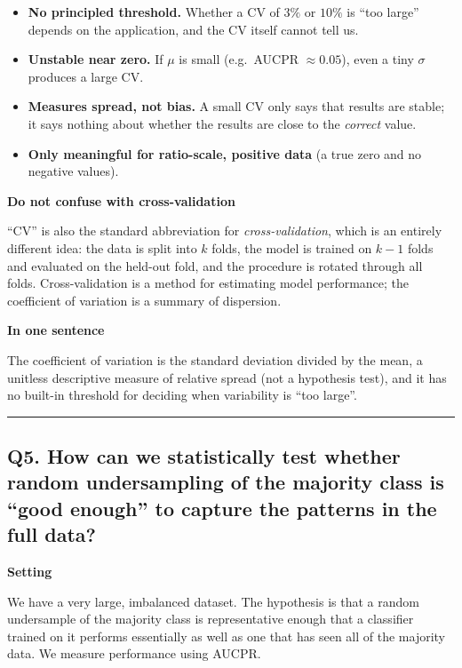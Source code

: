 \documentclass[11pt]{article}
\begin{document}
\begin{itemize}
    \item \textbf{No principled threshold.} Whether a CV of \(3\%\) or \(10\%\) is ``too large'' depends on the application, and the CV itself cannot tell us.
    \item \textbf{Unstable near zero.} If \(\mu\) is small (e.g.\ AUCPR \(\approx 0.05\)), even a tiny \(\sigma\) produces a large CV.
    \item \textbf{Measures spread, not bias.} A small CV only says that results are stable; it says nothing about whether the results are close to the \emph{correct} value.
    \item \textbf{Only meaningful for ratio-scale, positive data} (a true zero and no negative values).
\end{itemize}

\textbf{Do not confuse with cross-validation}

``CV'' is also the standard abbreviation for \emph{cross-validation}, which is an entirely different idea: the data is split into \(k\) folds, the model is trained on \(k-1\) folds and evaluated on the held-out fold, and the procedure is rotated through all folds. Cross-validation is a method for estimating model performance; the coefficient of variation is a summary of dispersion.

\textbf{In one sentence}

The coefficient of variation is the standard deviation divided by the mean, a unitless descriptive measure of relative spread (not a hypothesis test), and it has no built-in threshold for deciding when variability is ``too large''.

\vspace{5mm}
\hrule
\vspace{5mm}

\subsection*{Q5. How can we statistically test whether random undersampling of the majority class is ``good enough'' to capture the patterns in the full data?}

\textbf{Setting}

We have a very large, imbalanced dataset. The hypothesis is that a random undersample of the majority class is representative enough that a classifier trained on it performs essentially as well as one that has seen all of the majority data. We measure performance using AUCPR.
\end{document}
